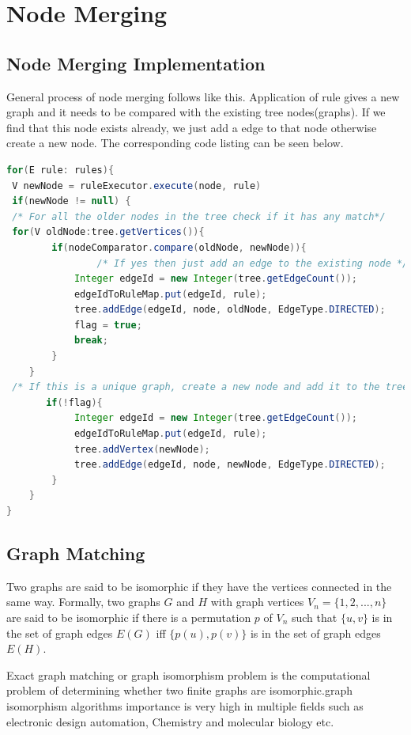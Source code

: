 \chapter{Node Merging} \label{nodemerging}

\section{Node Merging Implementation}
General process of node merging follows like this. Application of rule gives a new graph and it needs to be compared with the existing tree nodes(graphs). If we find that this node exists already, we just add a edge to that node otherwise create a new node. The corresponding code listing can be seen below.

\begin{lstlisting}[language = Java,frame = single]
 for(E rule: rules){
 V newNode = ruleExecutor.execute(node, rule)
 if(newNode != null) {
 /* For all the older nodes in the tree check if it has any match*/
 for(V oldNode:tree.getVertices()){  
        if(nodeComparator.compare(oldNode, newNode)){
	            /* If yes then just add an edge to the existing node */
            Integer edgeId = new Integer(tree.getEdgeCount());
     	    edgeIdToRuleMap.put(edgeId, rule);
    	    tree.addEdge(edgeId, node, oldNode, EdgeType.DIRECTED);
            flag = true;
            break;
        }
    }
 /* If this is a unique graph, create a new node and add it to the tree*/
	   if(!flag){
		    Integer edgeId = new Integer(tree.getEdgeCount()); 
    		edgeIdToRuleMap.put(edgeId, rule);	
	    	tree.addVertex(newNode);
		    tree.addEdge(edgeId, node, newNode, EdgeType.DIRECTED);
        }
    }
}
\end{lstlisting}

\section{Graph Matching}
Two graphs are said to be isomorphic if they have the vertices connected in the same way. Formally, two graphs $G$ and $H$ with graph vertices $V_n =\{1,2,...,n\}$ are said to be isomorphic if there is a permutation $p$ of $V_n$ such that $\{u,v\}$ is in the set of graph
edges $E(G)$ iff $\{p(u),p(v)\}$ is in the set of graph edges $E(H)$.

Exact graph matching or graph isomorphism problem is the computational problem of determining whether two finite graphs are isomorphic.graph isomorphism algorithms importance is very high in multiple fields such as electronic design automation, Chemistry and molecular biology etc.

